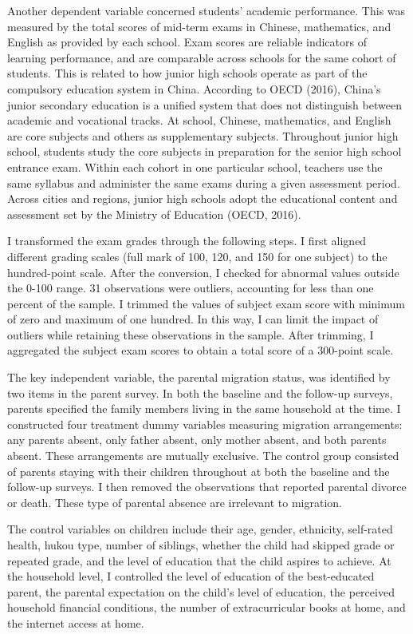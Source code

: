 \documentclass[
  man,floatsintext]{apa7}
\begin{document}
Another dependent variable concerned students' academic performance. This was measured by the total scores of mid-term exams in Chinese, mathematics, and English as provided by each school. Exam scores are reliable indicators of learning performance, and are comparable across schools for the same cohort of students. This is related to how junior high schools operate as part of the compulsory education system in China. According to OECD (2016), China's junior secondary education is a unified system that does not distinguish between academic and vocational tracks. At school, Chinese, mathematics, and English are core subjects and others as supplementary subjects. Throughout junior high school, students study the core subjects in preparation for the senior high school entrance exam. Within each cohort in one particular school, teachers use the same syllabus and administer the same exams during a given assessment period. Across cities and regions, junior high schools adopt the educational content and assessment set by the Ministry of Education (OECD, 2016).

I transformed the exam grades through the following steps. I first aligned different grading scales (full mark of 100, 120, and 150 for one subject) to the hundred-point scale. After the conversion, I checked for abnormal values outside the 0-100 range. 31 observations were outliers, accounting for less than one percent of the sample. I trimmed the values of subject exam score with minimum of zero and maximum of one hundred. In this way, I can limit the impact of outliers while retaining these observations in the sample. After trimming, I aggregated the subject exam scores to obtain a total score of a 300-point scale.

The key independent variable, the parental migration status, was identified by two items in the parent survey. In both the baseline and the follow-up surveys, parents specified the family members living in the same household at the time. I constructed four treatment dummy variables measuring migration arrangements: any parents absent, only father absent, only mother absent, and both parents absent. These arrangements are mutually exclusive. The control group consisted of parents staying with their children throughout at both the baseline and the follow-up surveys. I then removed the observations that reported parental divorce or death. These type of parental absence are irrelevant to migration.

The control variables on children include their age, gender, ethnicity, self-rated health, hukou type, number of siblings, whether the child had skipped grade or repeated grade, and the level of education that the child aspires to achieve. At the household level, I controlled the level of education of the best-educated parent, the parental expectation on the child's level of education, the perceived household financial conditions, the number of extracurricular books at home, and the internet access at home.
\end{document}
